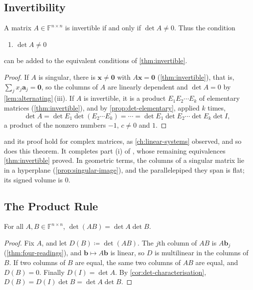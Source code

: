 \subsection{Invertibility}

\begin{theorem}
\label{thm:det-invertible}
A matrix $A\in\mathbb F^{n\times n}$ is invertible if and only if $\det A\ne0$. Thus the condition
\begin{enumerate}
\item[(x)] $\det A\ne0$
\end{enumerate}
can be added to the equivalent conditions of \cref{thm:invertible}.
\end{theorem}

\begin{proof}
If $A$ is singular, there is $\mathbf x\ne\mathbf 0$ with $A\mathbf x=\mathbf 0$ (\cref{thm:invertible}), that is, $\sum_jx_j\mathbf a_j=\mathbf 0$, so the columns of $A$ are linearly dependent and $\det A=0$ by \cref{lem:alternating}\,(iii). If $A$ is invertible, it is a product $E_1E_2\cdots E_k$ of elementary matrices (\cref{thm:invertible}), and by \cref{prop:det-elementary}, applied $k$ times,
\[
\det A=\det E_1\det(E_2\cdots E_k)=\cdots=\det E_1\det E_2\cdots\det E_k\det I ,
\]
a product of the nonzero numbers $-1$, $c\ne0$ and $1$.
\end{proof}

 and its proof hold for complex matrices, as \cref{ch:linear-systems} observed, and so does this theorem. It completes part (i) of , whose remaining equivalences \cref{thm:invertible} proved. In geometric terms, the columns of a singular matrix lie in a hyperplane (\cref{prop:singular-image}), and the parallelepiped they span is flat; its signed volume is $0$.

\subsection{The Product Rule}

\begin{theorem}
\label{thm:det-product}
For all $A,B\in\mathbb F^{n\times n}$, $\det(AB)=\det A\det B$.
\end{theorem}

\begin{proof}
Fix $A$, and let $D(B)\coloneqq\det(AB)$. The $j$th column of $AB$ is $A\mathbf b_j$ (\cref{thm:four-readings}), and $\mathbf b\mapsto A\mathbf b$ is linear, so $D$ is multilinear in the columns of $B$. If two columns of $B$ are equal, the same two columns of $AB$ are equal, and $D(B)=0$. Finally $D(I)=\det A$. By \cref{cor:det-characterisation}, $D(B)=D(I)\det B=\det A\det B$.
\end{proof}

